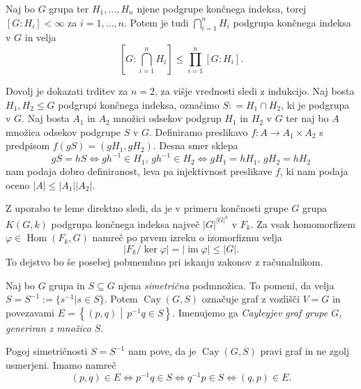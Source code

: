 \begin{lema}\label{lem_koncni_indeks_koncnega_preseka}
Naj bo $G$ grupa ter $H_1, \ldots, H_n$ njene podgrupe končnega indeksa, torej $[G: H_i] < \infty$ za $i = 1, \ldots, n$. Potem je tudi $\bigcap_{i = 1}^{n} H_i$ podgrupa končnega indeksa v $G$ in velja
\begin{equation*}
\left[ G: \bigcap_{i = 1}^{n} H_i \right]  \le \prod_{i=1}^{n} [G: H_i].  
\end{equation*} 
\end{lema}

\begin{dokaz}
Dovolj je dokazati trditev za $n = 2$, za višje vrednosti sledi z indukcijo. Naj bosta $H_1, H_2 \le G$ podgrupi končnega indeksa, označimo $S: = H_1 \cap H_2$, ki je podgrupa v $G$. Naj bosta $A_1$ in $A_2$ množici odsekov podgrup $H_1$ in $H_2$ v $G$ ter naj bo $A$ množica odsekov podgrupe $S$ v $G$.
 Definiramo preslikavo $f : A \to  A_1 \times A_2$ s predpisom $f(g S ) = (g H_1, g H_2)$. Desna smer sklepa \begin{equation*}
 g S = h S \iff gh^{-1} \in H_1, \, gh^{-1} \in H_2  \iff g H_1 = h H_1, \, g H_2 = h H_2
\end{equation*}  
nam podaja dobro definiranost, leva pa injektivnost preslikave $f$, ki nam podaja oceno $\lvert A \rvert \le  \lvert A_1 \rvert \lvert A_2 \rvert $.    
\end{dokaz}
Z uporabo te leme direktno sledi, da je v primeru končnosti grupe $G$ grupa $K(G, k)$ podgrupa končnega indeksa največ $\lvert G \rvert^{ \lvert G \rvert^k}$ v $F_k$. 
Za vsak homomorfizem $\varphi \in \operatorname{Hom}(F_k, G)$ namreč po prvem izreku o izomorfizmu velja \begin{equation*}
    \lvert F_k / \ker \varphi \rvert = \lvert \operatorname{im} \varphi \rvert \le \lvert G \rvert. 
\end{equation*}
To dejstvo bo še posebej pobmembno pri iskanju zakonov z računalnikom.


\begin{definicija}
\label{def_cayleyev_graf}
Naj bo $G$ grupa in $S \subseteq G$ njena \emph{simetrična} podmnožica. To pomeni, da velja $S = S^{-1} := \{ s^{-1}  \vert s \in S  \}$. Potem $\operatorname{Cay}(G, S)$ označuje graf z vozlišči $V = G$ in povezavami
$E = \left\{ (p, q) \middle|\, p^{-1}q \in  S \right\}$. Imenujemo ga \emph{Cayleyjev graf grupe $G$, generiran z množico $S$}.  
\end{definicija}

\begin{opomba}
Pogoj simetričnosti $S = S^{-1}$ nam pove, da je $\operatorname{Cay}(G, S)$ pravi graf in ne zgolj usmerjeni. Imamo namreč \begin{equation*}
(p,q) \in  E \iff p^{-1}q \in S \iff q^{-1}p \in S \iff (q,p) \in  E.
\end{equation*}  
\end{opomba}

